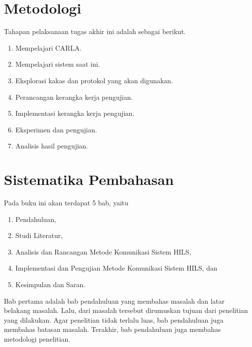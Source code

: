 \section{Metodologi}


Tahapan pelaksanaan tugas akhir ini adalah sebagai berikut.

\begin{enumerate}
	\item Mempelajari CARLA.
	\item Mempelajari sistem saat ini.
	\item Eksplorasi kakas dan protokol yang akan digunakan.
	\item Perancangan kerangka kerja pengujian.
	\item Implementasi kerangka kerja pengujian.
	\item Eksperimen dan pengujian.
	\item Analisis hasil pengujian.
\end{enumerate}

\section{Sistematika Pembahasan}


Pada buku ini akan terdapat 5 bab, yaitu
\begin{enumerate}
	\item Pendahuluan,
	\item Studi Literatur,
	\item Analisis dan Rancangan Metode Komunikasi Sistem HILS,
	\item Implementasi dan Pengujian Metode Komunikasi Sistem HILS, dan
	\item Kesimpulan dan Saran.
\end{enumerate}

Bab pertama adalah bab pendahuluan yang membahas masalah dan latar belakang
masalah. Lalu, dari masalah tersebut dirumuskan tujuan dari penelitian yang
dilakukan. Agar penelitian tidak terlalu luas, bab pendahuluan juga membahas
batasan masalah. Terakhir, bab pendahuluan juga membahas metodologi penelitian.

